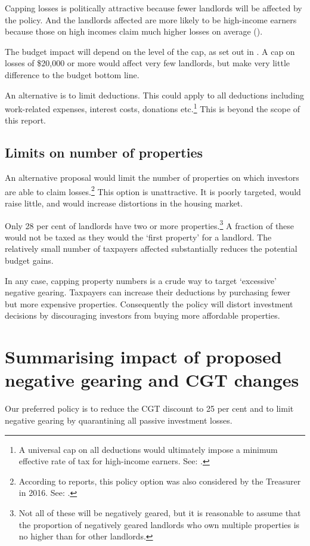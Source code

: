 Capping losses is politically attractive because fewer landlords will be affected by the policy. 
And the landlords affected are more likely to be high-income earners because those on high incomes claim much higher losses on average (). 

The budget impact will depend on the level of the cap, as set out in . A cap on losses of \$20,000 or more would affect very few landlords, but make very little difference to the budget bottom line.

An alternative is to limit deductions. This could apply to all deductions including work-related expenses, interest costs, donations etc.\footnote{A universal cap on all deductions would ultimately impose a minimum effective rate of tax for high-income earners. See: \textcite[][61]{BCA2016}.}  This is beyond the scope of this report. 

\subsection{Limits on number of properties}
An alternative proposal would limit the number of properties on which investors are able to claim losses.\footnote{According to reports, this policy option was also considered by the Treasurer in 2016. See: \textcite{Coorey2016}.}  This option is unattractive. It is poorly targeted, would raise little, and would increase distortions in the housing market.

Only 28 per cent of landlords have two or more properties.\footnote{\textcites{ABS2015-Survey-of-income-and-housing-2013-14}{HILDA2015} Not all of these will be negatively geared, but it is reasonable to assume that the proportion of negatively geared landlords who own multiple properties is no higher than for other landlords.} A fraction of these would not be taxed as they would the ‘first property’ for a landlord. The relatively small number of taxpayers affected substantially reduces the potential budget gains. 

In any case, capping property numbers is a crude way to target ‘excessive’ negative gearing. Taxpayers can increase their deductions by purchasing fewer but more expensive properties. Consequently the policy will distort investment decisions by discouraging investors from buying more affordable properties. 

\section{Summarising impact of proposed negative gearing and CGT changes}\label{sec:Summarizing-impact-proposed-NG-and-CGT}
Our preferred policy is to reduce the CGT discount to 25 per cent and to limit negative gearing by quarantining all passive investment losses.

